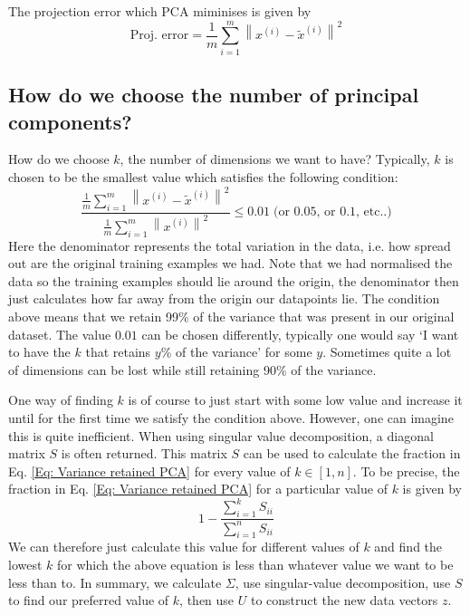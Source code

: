 \documentclass[a4paper, 10pt,hidelinks]{article}
\newcommand{\ind}[1]{^{(#1)}}
\newcommand{\norm}[1]{\left\lVert#1\right\rVert}
\begin{document}
The projection error which PCA miminises is given by  
\begin{equation}
\text{Proj. error} = \frac{1}{m} \sum_{i = 1}^m \norm{x\ind{i} - \tilde{x}\ind{i}}^2
\end{equation}

\subsection{How do we choose the number of principal components?}
How do we choose $k$, the number of dimensions we want to have? Typically, $k$ is chosen to be the smallest value which satisfies the following condition:
\begin{equation}\label{Eq: Variance retained PCA}
\frac{\frac{1}{m} \sum_{i = 1}^m \norm{x\ind{i} - \tilde{x}\ind{i}}^2}{\frac{1}{m}\sum_{i = 1}^m \norm{x\ind{i}}^2} \leq 0.01 \; (\text{or 0.05, or 0.1, etc..)}
\end{equation}
Here the denominator represents the total variation in the data, i.e. how spread out are the original training examples we had. Note that we had normalised the data so the training examples should lie around the origin, the denominator then just calculates how far away from the origin our datapoints lie. The condition above means that we retain 99\% of the variance that was present in our original dataset. The value $0.01$ can be chosen differently, typically one would say `I want to have the $k$ that retains $y$\% of the variance' for some $y$. Sometimes quite a lot of dimensions can be lost while still retaining 90\% of the variance.

One way of finding $k$ is of course to just start with some low value and increase it until for the first time we satisfy the condition above. However, one can imagine this is quite inefficient. When using singular value decomposition, a diagonal matrix $S$ is often returned. This matrix $S$ can be used to calculate the fraction in Eq. \eqref{Eq: Variance retained PCA} for every value of $k \in [1, n]$. To be precise, the fraction in Eq. \eqref{Eq: Variance retained PCA} for a particular value of $k$ is given by
\begin{equation}
1 - \frac{\sum_{i = 1}^k S_{ii}}{\sum_{i = 1}^n S_{ii}}
\end{equation}
We can therefore just calculate this value for different values of $k$ and find the lowest $k$ for which the above equation is less than whatever value we want to be less than to. In summary, we calculate $\Sigma$, use singular-value decomposition, use $S$ to find our preferred value of $k$, then use $U$ to construct the new data vectors $z$.
\end{document}
